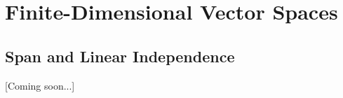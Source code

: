 \chapter{Finite-Dimensional Vector Spaces}

\section{Span and Linear Independence}

[Coming soon...]